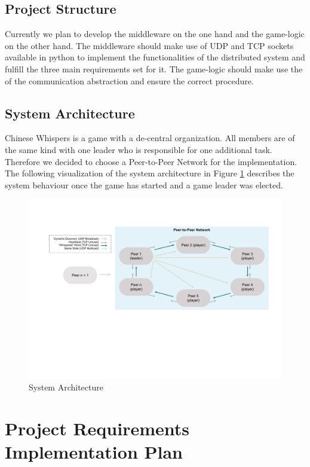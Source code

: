\documentclass[runningheads]{llncs}
\begin{document}
    \subsection{Project Structure}
    Currently we plan to develop the middleware on the one hand and the game-logic on the other hand. The middleware should make use of UDP and TCP sockets available in python to implement the functionalities of the distributed system and fulfill the three main requirements set for it. The game-logic should make use the of the communication abstraction and ensure the correct procedure. 
    
    \subsection{System Architecture}
    Chinese Whispers is a game with a de-central organization. All members are of the same kind with one leader who is responsible for one additional task. Therefore we decided to choose a Peer-to-Peer Network for the implementation. The following visualization of the system architecture in Figure \ref{fig:architecture} describes the system behaviour once the game has started and a game leader was elected.

    \begin{figure}
        \includegraphics[width=\textwidth]{architecture.pdf}
        \caption{System Architecture} \label{fig:architecture}
    \end{figure}

\section{Project Requirements Implementation Plan}
\end{document}
